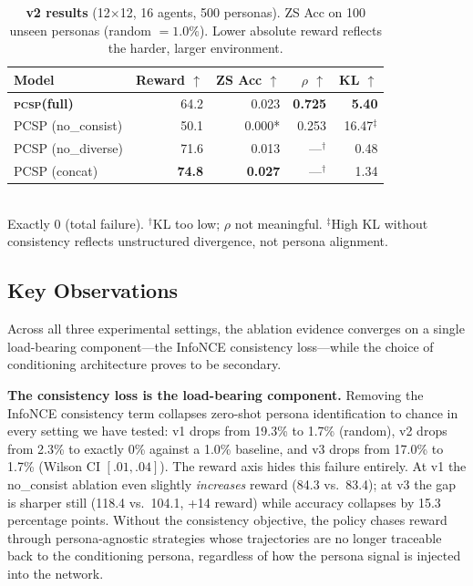 \documentclass[conference]{IEEEtran}
\newcommand{\PCSP}{\textsc{pcsp}\xspace}
\begin{document}
\begin{table}[t]
  \centering
  \small
  \caption{%
    \textbf{v2 results} (12$\times$12, 16 agents, 500 personas).
    ZS Acc on 100 unseen personas (random $=\!1.0\%$).
    Lower absolute reward reflects the harder, larger environment.}
  \label{tab:results_v2}
  \setlength{\tabcolsep}{3pt}
  \begin{tabular}{lrrrr}
    \toprule
    Model & Reward $\uparrow$ & ZS Acc $\uparrow$ & $\rho$ $\uparrow$ & KL $\uparrow$ \\
    \midrule
    \textbf{\PCSP (full)}  & 64.2 & 0.023 & \textbf{0.725} & \textbf{5.40} \\
    PCSP (no\_consist)     & 50.1 & 0.000*  & 0.253 & 16.47$^\ddagger$ \\
    PCSP (no\_diverse)     & 71.6 & 0.013   & ---$^\dagger$ & 0.48 \\
    PCSP (concat)          & \textbf{74.8} & \textbf{0.027} & ---$^\dagger$ & 1.34 \\
    \bottomrule
  \end{tabular}\\[2pt]
  {\footnotesize * Exactly 0 (total failure). $^\dagger$KL too low; $\rho$ not meaningful.
    $^\ddagger$High KL without consistency reflects unstructured divergence, not persona alignment.}
\end{table}

\subsection{Key Observations}

Across all three experimental settings, the ablation evidence converges on a
single load-bearing component---the InfoNCE consistency loss---while the
choice of conditioning architecture proves to be secondary.

\textbf{The consistency loss is the load-bearing component.}
Removing the InfoNCE consistency term collapses zero-shot persona
identification to chance in every setting we have tested:
v1 drops from 19.3\% to 1.7\% (random), v2 drops from 2.3\% to exactly 0\%
against a 1.0\% baseline, and v3 drops from 17.0\% to 1.7\% (Wilson CI
$[.01, .04]$).
The reward axis hides this failure entirely. At v1 the no\_consist ablation
even slightly \emph{increases} reward (84.3 vs.\ 83.4); at v3 the gap is
sharper still (118.4 vs.\ 104.1, +14 reward) while accuracy collapses by 15.3
percentage points.
Without the consistency objective, the policy chases reward through
persona-agnostic strategies whose trajectories are no longer traceable back
to the conditioning persona, regardless of how the persona signal is injected
into the network.
\end{document}
